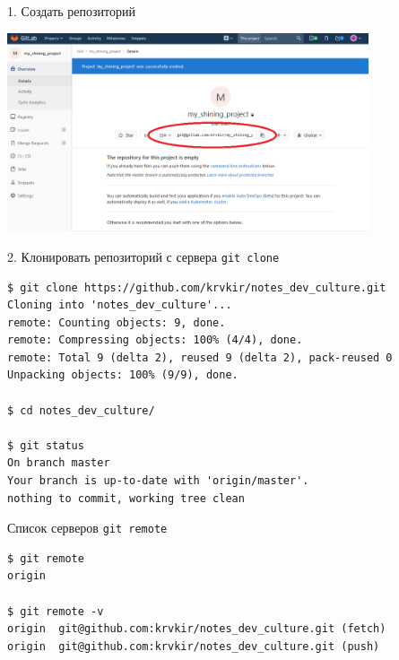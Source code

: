 \documentclass[presentation]{beamer}
\begin{document}
\begin{frame}[label={sec:org2f650fb}]{1. Создать репозиторий}
\begin{center}
\includegraphics[width=0.8\textwidth]{./01_vcs_03_remote_create_repo_3.PNG}
\end{center}
\end{frame}

\begin{frame}[fragile,label={sec:orgf7212af}]{2. Клонировать репозиторий с сервера}
 \alert{\texttt{git clone}}

\begin{verbatim}
$ git clone https://github.com/krvkir/notes_dev_culture.git                               
Cloning into 'notes_dev_culture'...
remote: Counting objects: 9, done.
remote: Compressing objects: 100% (4/4), done.
remote: Total 9 (delta 2), reused 9 (delta 2), pack-reused 0
Unpacking objects: 100% (9/9), done.

$ cd notes_dev_culture/

$ git status
On branch master
Your branch is up-to-date with 'origin/master'.
nothing to commit, working tree clean
\end{verbatim}
\end{frame}

\begin{frame}[fragile,label={sec:orga45b419}]{ Список серверов}
 \alert{\texttt{git remote}}

\begin{verbatim}
$ git remote
origin

$ git remote -v
origin  git@github.com:krvkir/notes_dev_culture.git (fetch)
origin  git@github.com:krvkir/notes_dev_culture.git (push)
\end{verbatim}
\end{frame}
\end{document}
